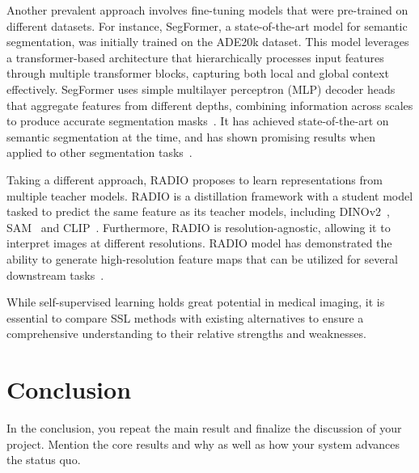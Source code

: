 \documentclass[a4paper,11pt,oneside]{report}
\begin{document}
Another prevalent approach involves fine-tuning models that were pre-trained on different datasets. For instance, SegFormer, a state-of-the-art model for semantic segmentation, was initially trained on the ADE20k dataset. This model leverages a transformer-based architecture that hierarchically processes input features through multiple transformer blocks, capturing both local and global context effectively. SegFormer uses simple multilayer perceptron (MLP) decoder heads that aggregate features from different depths, combining information across scales to produce accurate segmentation masks~\cite{Xie2021SegFormer}. It has achieved state-of-the-art on semantic segmentation at the time, and has shown promising results when applied to other segmentation tasks~\cite{Ghosh2024, Khaled2023}.

Taking a different approach, RADIO proposes to learn representations from multiple teacher models. RADIO is a distillation framework with a student model tasked to predict the same feature as its teacher models, including DINOv2~\cite{Oquab2024dinov}, SAM~\cite{Kirillov2023SAM} and CLIP~\cite{Radford2021CLIP}. Furthermore, RADIO is resolution-agnostic, allowing it to interpret images at different resolutions. RADIO model has demonstrated the ability to generate high-resolution feature maps that can be utilized for several downstream tasks~\cite{Ranzinger2024RADIO}.

While self-supervised learning holds great potential in medical imaging, it is essential to compare SSL methods with existing alternatives to ensure a comprehensive understanding to their relative strengths and weaknesses.

\chapter{Conclusion}

In the conclusion, you repeat the main result and finalize the discussion of
your project. Mention the core results and why as well as how your system
advances the status quo.

\cleardoublepage
{}
{}
\printbibliography

%
%
\end{document}
